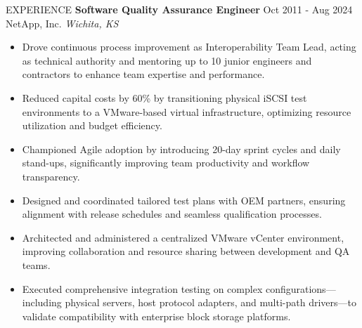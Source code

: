 \documentclass{resume} %
\begin{document}
\begin{rSection}{EXPERIENCE}
\textbf{Software Quality Assurance Engineer} \hfill Oct 2011 - Aug 2024\\
NetApp, Inc. \hfill \textit{Wichita, KS}
\begin{itemize}
\itemsep -3pt {} 
    \item Drove continuous process improvement as Interoperability Team Lead, acting as technical authority and mentoring up to 10 junior engineers and contractors to enhance team expertise and performance.
    \item Reduced capital costs by 60\% by transitioning physical iSCSI test environments to a VMware-based virtual infrastructure, optimizing resource utilization and budget efficiency.
    \item Championed Agile adoption by introducing 20-day sprint cycles and daily stand-ups, significantly improving team productivity and workflow transparency.
    \item Designed and coordinated tailored test plans with OEM partners, ensuring alignment with release schedules and seamless qualification processes.
    \item Architected and administered a centralized VMware vCenter environment, improving collaboration and resource sharing between development and QA teams.
    \item Executed comprehensive integration testing on complex configurations---including physical servers, host protocol adapters, and multi-path drivers---to validate compatibility with enterprise block storage platforms.
 \end{itemize}

\end{rSection} 


\end{document}
